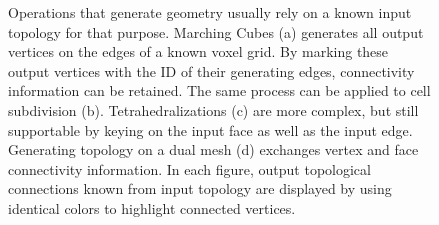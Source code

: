 \documentclass[10pt,journal,cspaper,compsoc]{IEEEtran}
\begin{document}
\begin{figure}[!tb]
\centering
{}
\quad
{}
\quad
{}
\quad
{}
\caption{Operations that generate geometry usually rely on a known input topology for that purpose. Marching Cubes (a) generates all output vertices on the edges of a known voxel grid. By marking these output vertices with the ID of their generating edges, connectivity information can be retained. The same process can be applied to cell subdivision (b). Tetrahedralizations (c) are more complex, but still supportable by keying on the input face as well as the input edge. Generating topology on a dual mesh (d) exchanges vertex and face connectivity information. In each figure, output topological connections known from input topology are displayed by using identical colors to highlight connected vertices.}
\label{fig:teaser}
\end{figure}
\end{document}

